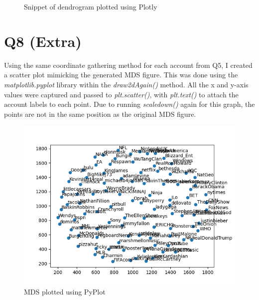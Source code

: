 \documentclass[12pt]{article}
\begin{document}
\begin{figure}[H]
            \caption{Snippet of dendrogram plotted using Plotly}
            \label{fig:my_label}
        \end{figure}

\section*{Q8 (Extra)}
Using the same coordinate gathering method for each account from Q5, I created a scatter plot mimicking the generated MDS figure. This was done using the \emph{matplotlib.pyplot} library within the \emph{draw2dAgain()} method. All the x and y-axis values were captured and passed to \emph{plt.scatter()}, with \emph{plt.text()} to attach the account labels to each point. Due to running \emph{scaledown()} again for this graph, the points are not in the same position as the original MDS figure.

\begin{figure}[H]
            \centering
            \includegraphics[scale=1.0,trim = 0 0 0 0, clip]{mds_pyplot.png}
            \caption{MDS plotted using PyPlot}
            \label{fig:my_label}
        \end{figure}
\end{document}
